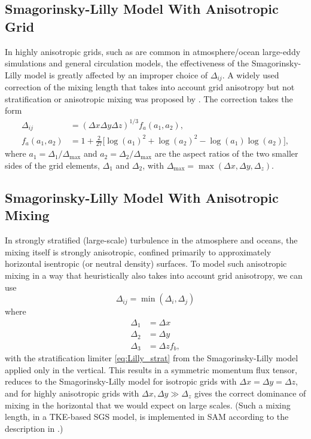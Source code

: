 \documentclass{report}
\begin{document}
\subsection{Smagorinsky-Lilly Model With Anisotropic Grid}
 
In highly anisotropic grids, such as are common in atmosphere/ocean large-eddy simulations and general circulation models, the effectiveness of the Smagorinsky-Lilly model is greatly affected by an improper choice of $\Delta_{ij}$. A widely used correction of the mixing length that takes into account grid anisotropy but not stratification or anisotropic mixing was proposed by  \citet{scottiMeneveauLilly1993}. The correction takes the form
\begin{align}
\Delta_{ij} &= (\Delta x \Delta y \Delta z)^{1/3} f_{a}(a_1, a_2),   \\
f_a(a_1, a_2) &= 1+\frac{2}{27}\Big[\log(a_{1})^2 + \log(a_2)^2 -\log(a_1)\log(a_2)\Big],
\end{align}
where  $a_1 =  \Delta_1/\Delta_{\max}$ and $a_2 = \Delta_2/\Delta_{\max}$ are the aspect ratios of the two smaller sides of the grid elements, $\Delta_1$ and $\Delta_2$, with $\Delta_{\max} = \max(\Delta x, \Delta y, \Delta_z)$. 

\subsection{Smagorinsky-Lilly Model With Anisotropic Mixing}\label{s:anisotropic_SGS_mixing}

In strongly stratified (large-scale) turbulence in the atmosphere and oceans, the mixing itself is strongly anisotropic, confined primarily to approximately horizontal isentropic (or neutral density) surfaces. To model such anisotropic mixing in a way that heuristically also takes into account grid anisotropy, we can use 
\begin{equation}
\Delta_{ij} = \min(\Delta_i, \Delta_j)  
\end{equation}
where 
\begin{align}
\Delta_1 & = \Delta x \\
\Delta_2 & = \Delta y \\
\Delta_3 & = \Delta z f_b,
\end{align}
with the stratification limiter \eqref{eq:Lilly_strat} from the Smagorinsky-Lilly model applied only in the vertical. This results in a symmetric momentum flux tensor, reduces to the Smagorinsky-Lilly model for isotropic grids with $\Delta x = \Delta y = \Delta z$, and for highly anisotropic grids with $\Delta x, \Delta y \gg \Delta_z$ gives the correct dominance of mixing in the horizontal that we would expect on large scales. (Such a mixing length, in a TKE-based SGS model, is implemented in SAM according to the description in \citet{Stevens05a}.) 
\end{document}
